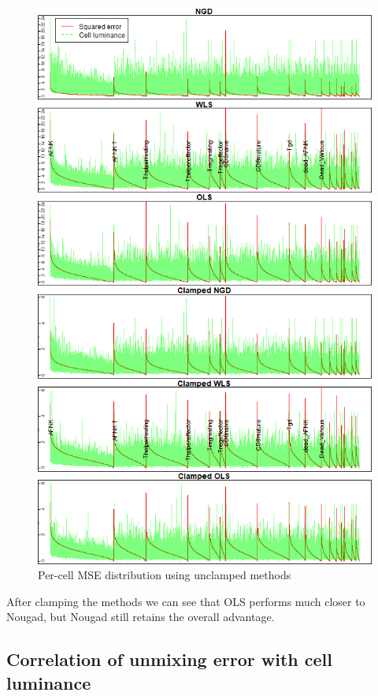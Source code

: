 \begin{figure}
  \includegraphics[width=1.0\linewidth]{img/errdist.png}
  \caption{Per-cell MSE distribution using unclamped methods}
  \label{fig:MSEcell_dist}
\end{figure}

After clamping the methods we can see that OLS performs much closer to Nougad, but Nougad still retains the overall advantage.

\subsection{Correlation of unmixing error with cell luminance}

